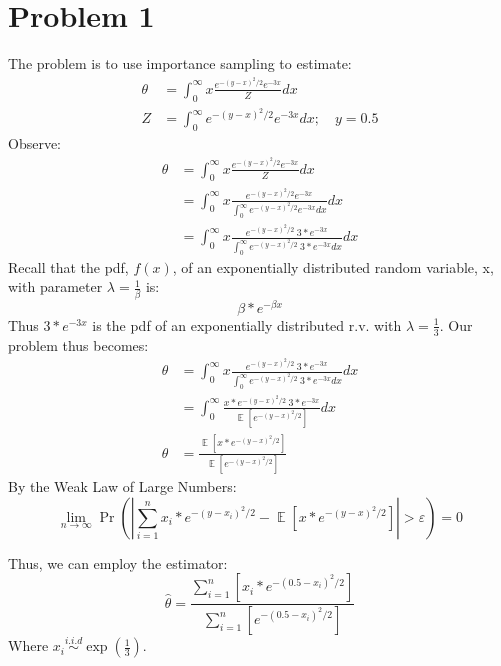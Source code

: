 \documentclass[12pt]{article}
\DeclareMathOperator{\EX}{\mathbb{E}}%
\begin{document}
	
	 

\section*{Problem 1}
	The problem is to use importance sampling to estimate:
	\begin{align*}
		\theta &=\int_{0}^{\infty} x \frac{e^{-(y-x)^{2} / 2} e^{-3 x}}{Z} d x \\
		Z&=\int_{0}^{\infty} e^{-(y-x)^{2} / 2} e^{-3 x} d x;\quad y=0.5
	\end{align*}
	Observe:
	\begin{align*}
	\theta &=\int_{0}^{\infty} x \frac{e^{-(y-x)^{2} / 2} e^{-3 x}}{Z} d x \\
	&=\int_{0}^{\infty} x \frac{e^{-(y-x)^{2} / 2} e^{-3 x}}{\int_{0}^{\infty} e^{-(y-x)^{2} / 2} e^{-3 x} d x} d x\\
	&=\int_{0}^{\infty} x \frac{e^{-(y-x)^{2} / 2}\ 3*e^{-3 x}}{\int_{0}^{\infty} e^{-(y-x)^{2} / 2}\ 3*e^{-3 x} d x} d x
	\end{align*}
	Recall that the pdf, $ f(x) $, of an exponentially distributed random variable, x, with parameter $ \lambda =  \frac{1}{\beta} $ is:
	\[ \beta*e^{-\beta x} \]
	Thus $ 3*e^{-3 x} $ is the pdf of an exponentially distributed r.v. with $ \lambda = \frac{1}{3} $. Our problem thus becomes:
	\begin{align*}
		\theta &=\int_{0}^{\infty} x \frac{e^{-(y-x)^{2} / 2}\ 3*e^{-3 x}}{\int_{0}^{\infty} e^{-(y-x)^{2} / 2}\ 3*e^{-3 x} d x} d x\\
		&=\int_{0}^{\infty}  \frac{x*e^{-(y-x)^{2} / 2}\ 3*e^{-3 x}}{\EX[e^{-(y-x)^{2} / 2}] } d x \\
		\theta &= \frac{\EX[x*e^{-(y-x)^{2} / 2}] }{\EX[e^{-(y-x)^{2} / 2}] }
	\end{align*}
	By the Weak Law of Large Numbers: \[ \lim\limits_{n \to \infty} \Pr\left( \left| \sum\limits_{i=1}^n x_i*e^{-(y-x_i)^{2} / 2} - \EX[x*e^{-(y-x)^{2} / 2}] \right| > \varepsilon \right) = 0 \]
	
	Thus, we can employ the estimator:
		\[ \hat{\theta} = \frac{\sum\limits_{i=1}^n[x_i*e^{-(0.5-x_i)^{2} / 2}] }{\sum\limits_{i=1}^n[e^{-(0.5-x_i)^{2} / 2}] } \]
	Where $ x_i\overset{i.i.d}{\sim}\exp(\frac{1}{3}) $. 
	
\end{document}
